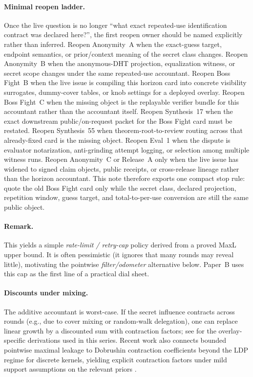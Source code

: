 \documentclass[11pt]{article}
\begin{document}
\paragraph{Minimal reopen ladder.}
Once the live question is no longer ``what exact repeated-use identification contract was declared here?'', the first reopen owner should be named explicitly rather than inferred.
Reopen Anonymity~A when the exact-guess target, endpoint semantics, or prior/context meaning of the secret class changes.
Reopen Anonymity~B when the anonymous-DHT projection, equalization witness, or secret scope changes under the same repeated-use accountant.
Reopen Boss Fight~B when the live issue is compiling this horizon card into concrete visibility surrogates, dummy-cover tables, or knob settings for a deployed overlay.
Reopen Boss Fight~C when the missing object is the replayable verifier bundle for this accountant rather than the accountant itself.
Reopen Synthesis~17 when the exact downstream public/on-request packet for the Boss Fight card must be restated.
Reopen Synthesis~55 when theorem-root-to-review routing across that already-fixed card is the missing object.
Reopen Eval~1 when the dispute is evaluator notarization, anti-grinding attempt logging, or selection among multiple witness runs.
Reopen Anonymity~C or Release~A only when the live issue has widened to signed claim objects, public receipts, or cross-release lineage rather than the horizon accountant.
This note therefore exports one compact stop rule: quote the old Boss Fight card only while the secret class, declared projection, repetition window, guess target, and total-to-per-use conversion are still the same public object.\cite{series:oddsinflation,series:profiling,series:bossfightB,series:bossfightC,series:workedexample,series:seriesspines,series:evalnotary,series:abomoinl,series:releaseproperty}

\paragraph{Remark.}
This yields a simple \emph{rate-limit / retry-cap} policy derived from a proved MaxL upper bound.
It is often pessimistic (it ignores that many rounds may reveal little), motivating the pointwise \emph{filter/odometer} alternative below.
Paper~B uses this cap as the first line of a practical dial sheet.

\paragraph{Discounts under mixing.}
The additive accountant is worst-case.
If the secret influence contracts across rounds (e.g., due to cover mixing or random-walk delegation), one can replace linear growth by a discounted sum with contraction factors; see \cite{series:spectral} for the overlay-specific derivations used in this series. Recent work also connects bounded pointwise maximal leakage to Dobrushin contraction coefficients beyond the LDP regime for discrete kernels, yielding explicit contraction factors under mild support assumptions on the relevant priors \cite{grosse2026dobrushin}.
\end{document}
